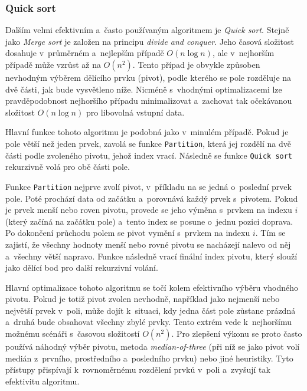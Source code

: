 \subsubsection*{Quick sort}

Dalším velmi efektivním a~často používaným algoritmem je \textit{Quick sort}.
Stejně jako \textit{Merge sort} je založen na principu \textit{divide and conquer}.
Jeho časová složitost dosahuje v~průměrném a~nejlepším případě $O(n \log n)$, ale v~nejhorším případě může vzrůst až na $O(n^2)$.
Tento případ je obvykle způsoben nevhodným výběrem dělícího prvku (pivot), podle kterého se pole rozděluje na dvě části, jak bude vysvětleno níže.
Nicméně s~vhodnými optimalizacemi lze pravděpodobnost nejhoršího případu minimalizovat a~zachovat tak očekávanou složitost $O(n \log n)$ pro libovolná vstupní data.~\cite{morin2013}

\begin{listing}[h]
    
    \caption{Pseudokód algoritmu Quick sort}
    \label{lst:quickSort}
\end{listing}

Hlavní funkce tohoto algoritmu je podobná jako v~minulém případě.
Pokud je pole větší než jeden prvek, zavolá se funkce \texttt{Partition}, která jej rozdělí na dvě části podle zvoleného pivotu, jehož index vrací.
Následně se funkce \texttt{Quick sort} rekurzivně volá pro obě části pole.

Funkce \texttt{Partition} nejprve zvolí pivot, v~příkladu na  se jedná o~poslední prvek pole.
Poté prochází data od začátku a~porovnává každý prvek s~pivotem.
Pokud je prvek menší nebo roven pivotu, provede se jeho výměna s~prvkem na indexu $i$ (který začíná na začátku pole) a~tento index se posune o~jednu pozici doprava.
Po dokončení průchodu polem se pivot vymění s~prvkem na indexu $i$.
Tím se zajistí, že všechny hodnoty menší nebo rovné pivotu se nacházejí nalevo od něj a~všechny větší napravo.
Funkce následně vrací finální index pivotu, který slouží jako dělící bod pro další rekurzivní volání.

Hlavní optimalizace tohoto algoritmu se točí kolem efektivního výběru vhodného pivotu.
Pokud je totiž pivot zvolen nevhodně, například jako nejmenší nebo největší prvek v~poli, může dojít k~situaci, kdy jedna část pole zůstane prázdná a~druhá bude obsahovat všechny zbylé prvky.
Tento extrém vede k~nejhoršímu možnému scénáři s~časovou složitostí $O(n^2)$.
Pro zlepšení výkonu se proto často používá náhodný výběr pivotu, metoda \textit{median-of-three} (při níž se jako pivot volí medián z~prvního, prostředního a~posledního prvku) nebo jiné heuristiky.
Tyto přístupy přispívají k~rovnoměrnému rozdělení prvků v~poli a~zvyšují tak efektivitu algoritmu.~\cite{morin2013}

